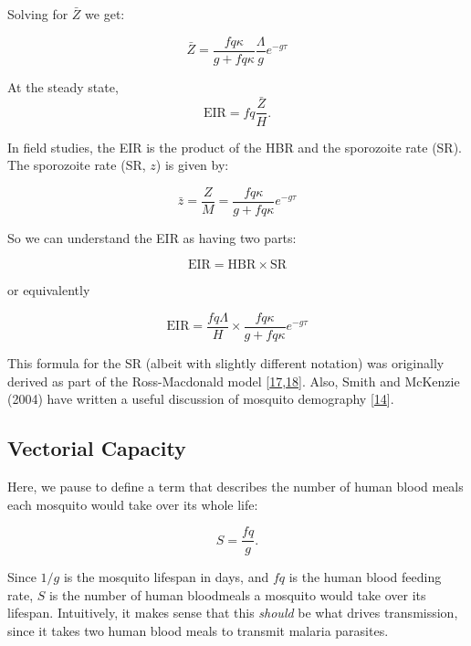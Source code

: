 \documentclass[
]{book}
\begin{document}
Solving for \(\bar Z\) we get:

\begin{equation}
\bar Z =  \frac{f q \kappa}{g + fq \kappa} \frac{\Lambda}{g} e^{-g\tau} 
\end{equation}

At the steady state, \[\mbox{EIR} = fq \frac{\bar Z}{H}.\]

In field studies, the EIR is the product of the HBR and the sporozoite rate (SR). The sporozoite rate (SR, \(z\)) is given by:

\begin{equation}
\bar z =  \frac{Z}{M} = \frac{f q \kappa}{g + fq \kappa} e^{-g\tau} 
\end{equation}

So we can understand the EIR as having two parts:

\begin{equation}
\mbox{EIR} = \mbox{HBR} \times  \mbox{SR} 
\end{equation}

or equivalently

\begin{equation}
\mbox{EIR} = \frac{\textstyle{fq\Lambda}}{\textstyle{H}} \times \frac{\textstyle{f q \kappa}}{\textstyle{g + fq \kappa}} e^{-g\tau} 
\end{equation}

This formula for the SR (albeit with slightly different notation) was originally derived as part of the Ross-Macdonald model {[}\protect\hyperlink{ref-MacdonaldG1952_SporozoiteRate}{17},\protect\hyperlink{ref-ArmitageP1953NoteEpidemiology}{18}{]}. Also, Smith and McKenzie (2004) have written a useful discussion of mosquito demography {[}\protect\hyperlink{ref-SmithDL2004_Statics}{14}{]}.

\hypertarget{vectorial-capacity}{%
\subsection{Vectorial Capacity}\label{vectorial-capacity}}

Here, we pause to define a term that describes the number of human blood meals each mosquito would take over its whole life:

\[S = \frac{fq}{g}.\]

Since \(1/g\) is the mosquito lifespan in days, and \(fq\) is the human blood feeding rate, \(S\) is the number of human bloodmeals a mosquito would take over its lifespan. Intuitively, it makes sense that this \emph{should} be what drives transmission, since it takes two human blood meals to transmit malaria parasites.
\end{document}
